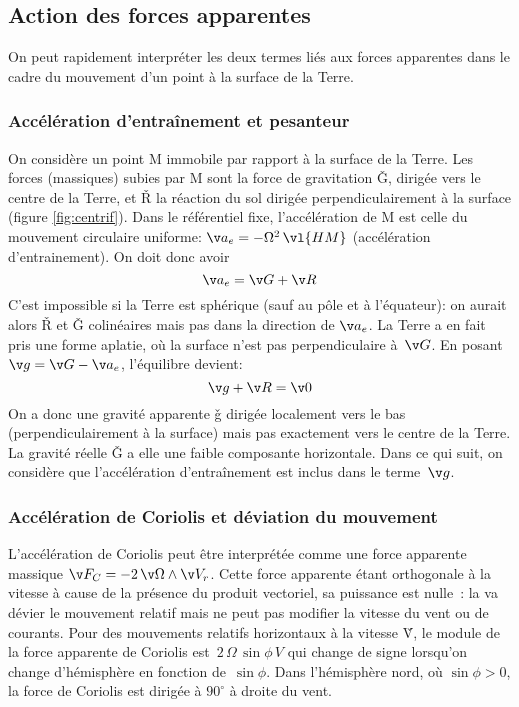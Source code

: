 \sk
\subsection{Action des forces apparentes}

\sk
On peut rapidement interpréter les deux termes liés aux forces apparentes dans le cadre du mouvement d'un point à la surface de la Terre.

\sk
\subsubsection{Accélération d'entraînement et pesanteur}

\sk
On considère un point M immobile par rapport à la surface de la Terre. Les forces (massiques) subies par M sont la force de gravitation \v G, dirigée vers le centre de la Terre, et \v R la réaction du sol dirigée perpendiculairement à la surface (figure \ref{fig:centrif}). Dans le référentiel fixe, l'accélération de M est celle du mouvement circulaire uniforme: $\v a_e = - \Omega^2 \, \vl{HM}$ (accélération d'entrainement). On doit donc avoir \[\v a_e=\v G+\v R\] 
C'est impossible si la Terre est sphérique (sauf au pôle et à l'équateur): on aurait alors \v R et \v G colinéaires mais pas dans la direction de $\v a_e$. La Terre a en fait pris une forme aplatie, où la surface n'est pas perpendiculaire à~$\v G$. En posant $\v g=\v G-\v a_e$, l'équilibre devient: \[\v g+\v R=\v 0\] On a donc une gravité apparente \v g dirigée localement vers le bas (perpendiculairement à la surface) mais pas exactement vers le centre de la Terre. La gravité réelle \v G a elle une faible composante horizontale. Dans ce qui suit, on considère que l'accélération d'entraînement est inclus dans le terme~$\v g$.


\sk
\subsubsection{Accélération de Coriolis et déviation du mouvement}

\sk
L'accélération de Coriolis peut être interprétée comme une force apparente massique $\v F_C = - 2 \, \v \Omega\wedge\v V_r$. Cette force apparente étant orthogonale à la vitesse à cause de la présence du produit vectoriel, sa puissance est nulle~: la  va dévier le mouvement relatif mais ne peut pas modifier la vitesse du vent ou de courants. Pour des mouvements relatifs horizontaux à la vitesse \v V, le module de la force apparente de Coriolis est~$2 \, \Omega \, \sin \phi \, V$ qui change de signe lorsqu'on change d'hémisphère en fonction de~$\sin \phi$. Dans l'hémisphère nord, où $\sin \phi>0$, la force de Coriolis est dirigée à $90^{\circ}$ à droite du vent. 


